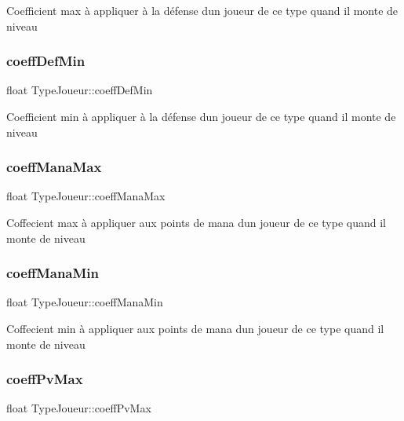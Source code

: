 Coefficient max à appliquer à la défense d\textquotesingle{}un joueur de ce type quand il monte de niveau \mbox{\label{structTypeJoueur_a02b4dc5d0f6165cbfa7beb6814909a71}} 
\subsubsection{\texorpdfstring{coeff\+Def\+Min}{coeffDefMin}}
{\footnotesize\ttfamily float Type\+Joueur\+::coeff\+Def\+Min}

Coefficient min à appliquer à la défense d\textquotesingle{}un joueur de ce type quand il monte de niveau \mbox{\label{structTypeJoueur_a372a71f7a1fa2477f25369ffa6bccf00}} 
\subsubsection{\texorpdfstring{coeff\+Mana\+Max}{coeffManaMax}}
{\footnotesize\ttfamily float Type\+Joueur\+::coeff\+Mana\+Max}

Coffecient max à appliquer aux points de mana d\textquotesingle{}un joueur de ce type quand il monte de niveau \mbox{\label{structTypeJoueur_a3ad5af235c91cc96e6fac4886a2ff8b0}} 
\subsubsection{\texorpdfstring{coeff\+Mana\+Min}{coeffManaMin}}
{\footnotesize\ttfamily float Type\+Joueur\+::coeff\+Mana\+Min}

Coffecient min à appliquer aux points de mana d\textquotesingle{}un joueur de ce type quand il monte de niveau \mbox{\label{structTypeJoueur_a68bb43ea61e33dd320a0aff87c9463b4}} 
\subsubsection{\texorpdfstring{coeff\+Pv\+Max}{coeffPvMax}}
{\footnotesize\ttfamily float Type\+Joueur\+::coeff\+Pv\+Max}

